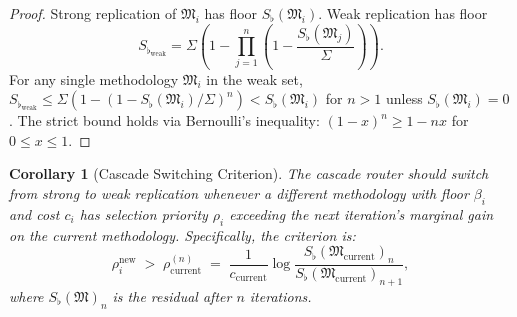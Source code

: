 \documentclass[twocolumn,11pt,a4paper]{article}
\newtheorem{corollary}[theorem]{Corollary}
\newcommand{\Method}{\mathfrak{M}}
\newcommand{\Sigmax}{\Sigma}
\newcommand{\Sfloor}{S_{\flat}}
\begin{document}
\begin{proof}
Strong replication of $\Method_i$ has floor $\Sfloor(\Method_i)$. Weak replication has floor
\[
\Sfloor_{\text{weak}} = \Sigmax \left(1 - \prod_{j=1}^{n} \left(1 - \frac{\Sfloor(\Method_j)}{\Sigmax}\right)\right).
\]
For any single methodology $\Method_i$ in the weak set, $\Sfloor_{\text{weak}} \leq \Sigmax(1 - (1 - \Sfloor(\Method_i)/\Sigmax)^n) < \Sfloor(\Method_i)$ for $n > 1$ unless $\Sfloor(\Method_i) = 0$. The strict bound holds via Bernoulli's inequality: $(1-x)^n \geq 1 - nx$ for $0 \leq x \leq 1$.
\end{proof}

\begin{corollary}[Cascade Switching Criterion]
\label{cor:switching-criterion}
The cascade router should switch from strong to weak replication whenever a different methodology with floor $\beta_i$ and cost $c_i$ has selection priority $\rho_i$ exceeding the next iteration's marginal gain on the current methodology. Specifically, the criterion is:
\[
\rho_i^{\text{new}} \;>\; \rho_{\text{current}}^{(n)} \;=\; \frac{1}{c_{\text{current}}} \log\frac{\Sfloor(\Method_{\text{current}})_{n}}{\Sfloor(\Method_{\text{current}})_{n+1}},
\]
where $\Sfloor(\Method)_{n}$ is the residual after $n$ iterations.
\end{corollary}
\end{document}
